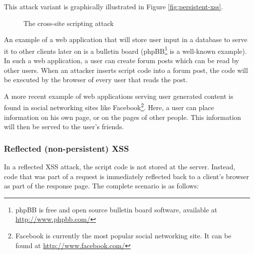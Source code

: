 This attack variant is graphically illustrated in Figure \ref{fig:persistent-xss}.

\begin{figure}[htb]
	\centering
	\caption{The cross-site scripting attack}
\end{figure}

An example of a web application that will store user input in a database to serve it to other clients later on is a bulletin board (phpBB\footnote{phpBB is free and open source bulletin board software, available at \url{http://www.phpbb.com/}} is a well-known example). In such a web application, a user can create forum posts which can be read by other users. When an attacker inserts script code into a forum post, the code will be executed by the browser of every user that reads the post.

A more recent example of web applications serving user generated content is found in social networking sites like Facebook\footnote{Facebook is currently the most popular social networking site. It can be found at \url{http://www.facebook.com/}}. Here, a user can place information on his own page, or on the pages of other people. This information will then be served to the user's friends.

\subsubsection{Reflected (non-persistent) XSS}
In a reflected XSS attack, the script code is not stored at the server. Instead, code that was part of a request is immediately reflected back to a client's browser as part of the response page. The complete scenario is as follows:

